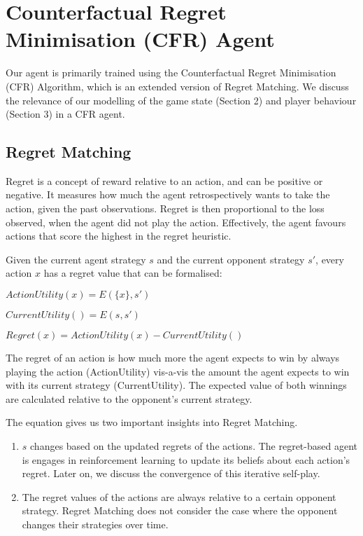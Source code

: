 \documentclass{article}
\begin{document}
\section{Counterfactual Regret Minimisation (CFR) Agent}

Our agent is primarily trained using the Counterfactual Regret Minimisation (CFR) Algorithm, which is an extended version of Regret Matching. We discuss the relevance of our modelling of the game state (Section 2) and player behaviour (Section 3) in a CFR agent.

\subsection{Regret Matching}

Regret is a concept of reward relative to an action, and can be positive or negative. It measures how much the agent retrospectively wants to take the action, given the past observations. Regret is then proportional to the loss observed, when the agent did not play the action. Effectively, the agent favours actions that score the highest in the regret heuristic. 

Given the current agent strategy $s$ and the current opponent strategy $s'$, every action $x$ has a regret value that can be formalised:

\begin{center}
$ActionUtility(x) = E(\{x\}, s')$

$CurrentUtility() = E(s, s')$

$Regret(x) = ActionUtility(x) - CurrentUtility()$
\end{center}

The regret of an action is how much more the agent expects to win by always playing the action (ActionUtility) vis-a-vis the amount the agent expects to win with its current strategy (CurrentUtility). The expected value of both winnings are calculated relative to the opponent's current strategy.

The equation gives us two important insights into Regret Matching.

\begin{enumerate}
	\item $s$ changes based on the updated regrets of the actions. The regret-based agent is engages in reinforcement learning to update its beliefs about each action's regret. Later on, we discuss the convergence of this iterative self-play.
	\item The regret values of the actions are always relative to a certain opponent strategy. Regret Matching does not consider the case where the opponent changes their strategies over time.
\end{enumerate}
\end{document}
